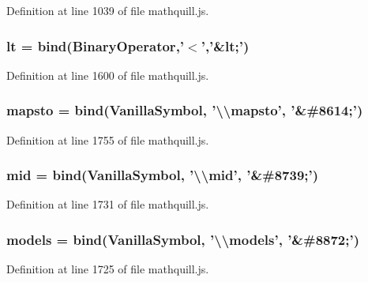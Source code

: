 Definition at line 1039 of file mathquill.\-js.

\subsubsection[{lt}]{ lt = {\bf bind}({\bf Binary\-Operator},'$<$','\&lt;')}\label{mathquill_8js_ac2b9298bcc3d72ed2a56e0ba03bc909a}


Definition at line 1600 of file mathquill.\-js.

\subsubsection[{mapsto}]{ mapsto = {\bf bind}({\bf Vanilla\-Symbol}, '\textbackslash{}\textbackslash{}mapsto', '\&\#8614;')}\label{mathquill_8js_af6a251e5b102a317722309e73add500a}


Definition at line 1755 of file mathquill.\-js.

\subsubsection[{mid}]{ mid = {\bf bind}({\bf Vanilla\-Symbol}, '\textbackslash{}\textbackslash{}mid', '\&\#8739;')}\label{mathquill_8js_a7dba7f010877302791f96666d9b8f892}


Definition at line 1731 of file mathquill.\-js.

\subsubsection[{models}]{ models = {\bf bind}({\bf Vanilla\-Symbol}, '\textbackslash{}\textbackslash{}models', '\&\#8872;')}\label{mathquill_8js_acba1f948631db71820ede22884d8982f}


Definition at line 1725 of file mathquill.\-js.

